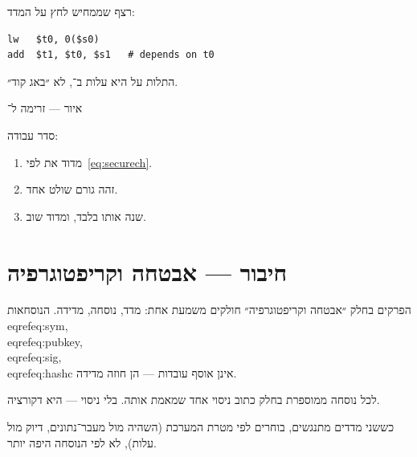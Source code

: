 רצף שממחיש לחץ על המדד:
\begin{asmblock}
\begin{lstlisting}[style=asm]
lw   $t0, 0($s0)
add  $t1, $t0, $s1   # depends on t0
\end{lstlisting}
\end{asmblock}
התלות על  היא עלות ב־, לא ״באג קוד״.

\begin{tikzpic}
\end{tikzpic}
\begin{center}\small איור — זרימה ל־\end{center}

סדר עבודה:
\begin{enumerate}
\item[(\textbf{א})] מדוד את  לפי~\eqref{eq:securech}.
\item[(\textbf{ב})] זהה גורם שולט אחד.
\item[(\textbf{ג})] שנה אותו בלבד, ומדוד שוב.
\end{enumerate}


\chapter{חיבור — אבטחה וקריפטוגרפיה}
\label{ch:bridge-sym}

הפרקים בחלק ״אבטחה וקריפטוגרפיה״ חולקים משמעת אחת: מדד, נוסחה, מדידה.
הנוסחאות \\eqref{eq:sym}, \\eqref{eq:pubkey}, \\eqref{eq:sig}, \\eqref{eq:hashc} אינן אוסף עובדות — הן חוזה מדידה.

\begin{keybox}[frametitle={חוזה החלק}]
לכל נוסחה ממוספרת בחלק כתוב ניסוי אחד שמאמת אותה. בלי ניסוי — היא דקורציה.
\end{keybox}

כששני מדדים מתנגשים, בוחרים לפי מטרת המערכת (השהיה מול מעבר־נתונים, דיוק מול עלות),
לא לפי הנוסחה היפה יותר.


